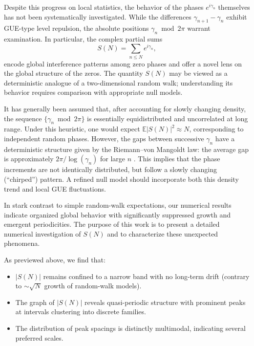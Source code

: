 \documentclass[11pt]{amsart}
\begin{document}
Despite this progress on local statistics, the behavior of the phases $e^{i\gamma_n}$ themselves has not been systematically investigated.  
While the differences $\gamma_{n+1}-\gamma_n$ exhibit GUE-type level repulsion, the absolute positions $\gamma_n \bmod 2\pi$ warrant examination.  
In particular, the complex partial sums 
\begin{equation}\label{eq:partialsum}
S(N)=\sum_{n\le N} e^{i\gamma_n},
\end{equation}
encode global interference patterns among zero phases and offer a novel lens on the global structure of the zeros.  
The quantity $S(N)$ may be viewed as a deterministic analogue of a two-dimensional random walk; understanding its behavior requires comparison with appropriate null models.

It has generally been assumed \cite{RudnickSarnak1996} that, after accounting for slowly changing density, the sequence $\{\gamma_n \bmod 2\pi\}$ is essentially equidistributed and uncorrelated at long range.  
Under this heuristic, one would expect $\mathbb{E}|S(N)|^2 \approx N$, corresponding to independent random phases.  
However, the gaps between successive $\gamma_n$ have a deterministic structure given by the Riemann--von Mangoldt law: the average gap is approximately $2\pi/\log(\gamma_n)$ for large $n$ \cite{Edwards1974}.  
This implies that the phase increments are not identically distributed, but follow a slowly changing (``chirped'') pattern.  
A refined null model should incorporate both this density trend and local GUE fluctuations.

In stark contrast to simple random-walk expectations, our numerical results indicate organized global behavior with significantly suppressed growth and emergent periodicities.  
The purpose of this work is to present a detailed numerical investigation of $S(N)$ and to characterize these unexpected phenomena.

As previewed above, we find that: 
\begin{itemize}
\item $|S(N)|$ remains confined to a narrow band with no long-term drift (contrary to $\sim \sqrt{N}$ growth of random-walk models).
\item The graph of $|S(N)|$ reveals quasi-periodic structure with prominent peaks at intervals clustering into discrete families.
\item The distribution of peak spacings is distinctly multimodal, indicating several preferred scales.
\end{itemize}
\end{document}
